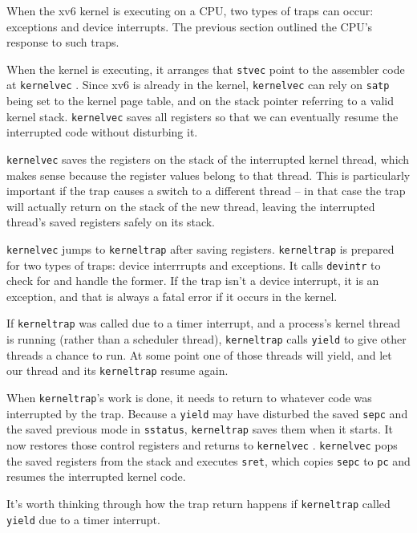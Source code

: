 When the xv6 kernel is executing on a CPU, two types of traps can
occur: exceptions and device interrupts. The previous section outlined
the CPU's response to such traps.

When the kernel is executing, it arranges that {\tt stvec} point
to the assembler code at {\tt kernelvec}
.
Since xv6 is already in the kernel, {\tt kernelvec} can rely
on {\tt satp} being set to the kernel page table, and on the
stack pointer referring to a valid kernel stack.
{\tt kernelvec} saves all registers so that we can
eventually resume the interrupted code without disturbing it.

{\tt kernelvec} saves the registers on the stack of the interrupted
kernel thread, which makes sense because the register values belong to
that thread. This is particularly important if the trap causes a
switch to a different thread -- in that case the trap will actually
return on the stack of the new thread, leaving the interrupted
thread's saved registers safely on its stack.

{\tt kernelvec} jumps to {\tt kerneltrap}
 after saving registers.
{\tt kerneltrap} is prepared for two types of traps:
device interrrupts and exceptions. It calls
{\tt devintr}
to check for and handle the former.
If the trap isn't a device interrupt, it is an exception,
and that is always a fatal error if it occurs in the kernel.

If {\tt kerneltrap} was called due to a timer interrupt, and a
process's kernel thread is running (rather than a scheduler thread),
{\tt kerneltrap} calls {\tt yield} to give other threads a chance to
run. At some point one of those threads will yield, and let our thread
and its {\tt kerneltrap} resume again.

When {\tt kerneltrap}'s work is done, it needs to return to whatever
code was interrupted by the trap. Because a {\tt yield} may have
disturbed the saved {\tt sepc} and the saved previous mode in {\tt sstatus},
{\tt kerneltrap} saves them when it starts. It now restores those
control registers and returns to {\tt kernelvec}
.
{\tt kernelvec} pops the saved registers from the stack and
executes {\tt sret}, which copies {\tt sepc} to {\tt pc}
and resumes the interrupted kernel code.

It's worth thinking through how the trap return happens if
{\tt kerneltrap} called {\tt yield} due to a timer interrupt.

